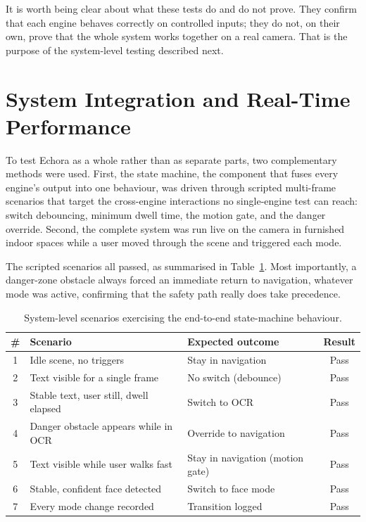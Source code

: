 It is worth being clear about what these tests do and do not prove. They confirm that each engine behaves correctly on controlled inputs; they do not, on their own, prove that the whole system works together on a real camera. That is the purpose of the system-level testing described next.

\section{System Integration and Real-Time Performance}

To test Echora as a whole rather than as separate parts, two complementary methods were used. First, the state machine, the component that fuses every engine's output into one behaviour, was driven through scripted multi-frame scenarios that target the cross-engine interactions no single-engine test can reach: switch debouncing, minimum dwell time, the motion gate, and the danger override. Second, the complete system was run live on the camera in furnished indoor spaces while a user moved through the scene and triggered each mode.

The scripted scenarios all passed, as summarised in Table~\ref{tab:system_tests}. Most importantly, a danger-zone obstacle always forced an immediate return to navigation, whatever mode was active, confirming that the safety path really does take precedence.

\begin{table}[H]
\centering
\caption{System-level scenarios exercising the end-to-end state-machine behaviour.}
\label{tab:system_tests}
\begin{tabular}{cp{}p{}c}
\toprule
\textbf{\#} & \textbf{Scenario} & \textbf{Expected outcome} & \textbf{Result} \\
\midrule
1 & Idle scene, no triggers & Stay in navigation & Pass \\
2 & Text visible for a single frame & No switch (debounce) & Pass \\
3 & Stable text, user still, dwell elapsed & Switch to OCR & Pass \\
4 & Danger obstacle appears while in OCR & Override to navigation & Pass \\
5 & Text visible while user walks fast & Stay in navigation (motion gate) & Pass \\
6 & Stable, confident face detected & Switch to face mode & Pass \\
7 & Every mode change recorded & Transition logged & Pass \\
\bottomrule
\end{tabular}
\end{table}


